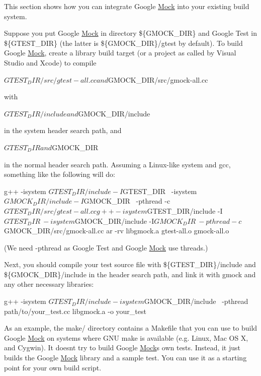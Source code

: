 This section shows how you can integrate Google \hyperlink{class_mock}{Mock} into your existing build system.

Suppose you put Google \hyperlink{class_mock}{Mock} in directory {\ttfamily \$\{G\+M\+O\+C\+K\+\_\+\+D\+IR\}} and Google Test in {\ttfamily \$\{G\+T\+E\+S\+T\+\_\+\+D\+IR\}} (the latter is {\ttfamily \$\{G\+M\+O\+C\+K\+\_\+\+D\+IR\}/gtest} by default). To build Google \hyperlink{class_mock}{Mock}, create a library build target (or a project as called by Visual Studio and Xcode) to compile \begin{DoxyVerb}${GTEST_DIR}/src/gtest-all.cc and ${GMOCK_DIR}/src/gmock-all.cc
\end{DoxyVerb}


with \begin{DoxyVerb}${GTEST_DIR}/include and ${GMOCK_DIR}/include
\end{DoxyVerb}


in the system header search path, and \begin{DoxyVerb}${GTEST_DIR} and ${GMOCK_DIR}
\end{DoxyVerb}


in the normal header search path. Assuming a Linux-\/like system and gcc, something like the following will do\+: \begin{DoxyVerb}g++ -isystem ${GTEST_DIR}/include -I${GTEST_DIR} \
    -isystem ${GMOCK_DIR}/include -I${GMOCK_DIR} \
    -pthread -c ${GTEST_DIR}/src/gtest-all.cc
g++ -isystem ${GTEST_DIR}/include -I${GTEST_DIR} \
    -isystem ${GMOCK_DIR}/include -I${GMOCK_DIR} \
    -pthread -c ${GMOCK_DIR}/src/gmock-all.cc
ar -rv libgmock.a gtest-all.o gmock-all.o
\end{DoxyVerb}


(We need -\/pthread as Google Test and Google \hyperlink{class_mock}{Mock} use threads.)

Next, you should compile your test source file with \$\{G\+T\+E\+S\+T\+\_\+\+D\+IR\}/include and \$\{G\+M\+O\+C\+K\+\_\+\+D\+IR\}/include in the header search path, and link it with gmock and any other necessary libraries\+: \begin{DoxyVerb}g++ -isystem ${GTEST_DIR}/include -isystem ${GMOCK_DIR}/include \
    -pthread path/to/your_test.cc libgmock.a -o your_test
\end{DoxyVerb}


As an example, the make/ directory contains a Makefile that you can use to build Google \hyperlink{class_mock}{Mock} on systems where G\+NU make is available (e.\+g. Linux, Mac OS X, and Cygwin). It doesn\textquotesingle{}t try to build Google \hyperlink{class_mock}{Mock}\textquotesingle{}s own tests. Instead, it just builds the Google \hyperlink{class_mock}{Mock} library and a sample test. You can use it as a starting point for your own build script.

